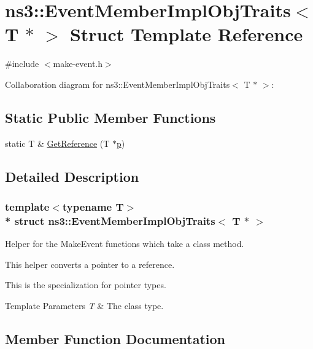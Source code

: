 \hypertarget{structns3_1_1EventMemberImplObjTraits_3_01T_01_5_01_4}{}\section{ns3\+:\+:Event\+Member\+Impl\+Obj\+Traits$<$ T $\ast$ $>$ Struct Template Reference}
\label{structns3_1_1EventMemberImplObjTraits_3_01T_01_5_01_4}


{\ttfamily \#include $<$make-\/event.\+h$>$}



Collaboration diagram for ns3\+:\+:Event\+Member\+Impl\+Obj\+Traits$<$ T $\ast$ $>$\+:
\subsection*{Static Public Member Functions}
\begin{DoxyCompactItemize}
\item 
static T \& \hyperlink{structns3_1_1EventMemberImplObjTraits_3_01T_01_5_01_4_acd04db966588dca18cd72302f651ad55}{Get\+Reference} (T $\ast$\hyperlink{lte__link__budget__x2__handover__measures_8m_ac9de518908a968428863f829398a4e62}{p})
\end{DoxyCompactItemize}


\subsection{Detailed Description}
\subsubsection*{template$<$typename T$>$\\*
struct ns3\+::\+Event\+Member\+Impl\+Obj\+Traits$<$ T $\ast$ $>$}

Helper for the Make\+Event functions which take a class method.

This helper converts a pointer to a reference.

This is the specialization for pointer types.


\begin{DoxyTemplParams}{Template Parameters}
{\em T} & The class type. \\
\hline
\end{DoxyTemplParams}


\subsection{Member Function Documentation}
